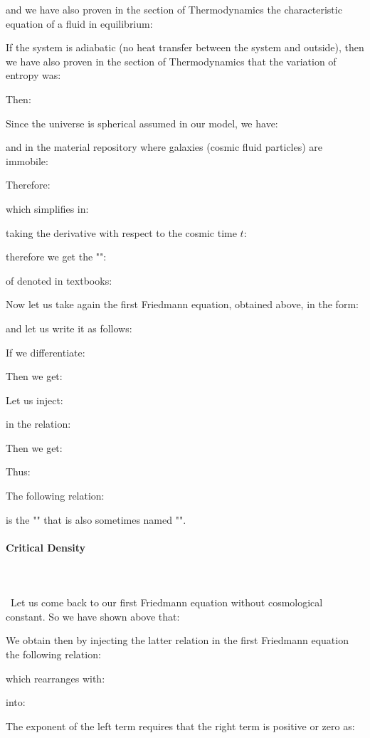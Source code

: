 	and we have also proven in the section of Thermodynamics the characteristic equation of a fluid in equilibrium:
	
	If the system is adiabatic (no heat transfer between the system and outside), then we have also proven in the section of Thermodynamics that the variation of entropy was:
	
	Then:
	
	Since the universe is spherical assumed in our model, we have:
	
	and in the material repository where galaxies (cosmic fluid particles) are immobile:
	
	Therefore:
	
	which simplifies in:
	
	taking the derivative with respect to the cosmic time $t$:
	
	therefore we get the "":
	
	of denoted in textbooks:
	
	Now let us take again the first Friedmann equation, obtained above, in the form:
	
	and let us write it as follows:
	
	If we differentiate:
	
	Then we get:
	
	Let us inject:
	
	in the relation:
	
	Then we get:
	
	Thus:
	
	The following relation:
	
	is the "" that is also sometimes named "".
		
	\paragraph{Critical Density}\mbox{}\\\\\
	Let us come back to our first Friedmann equation without cosmological constant. So we have shown above that:
	
	We obtain then by injecting the latter relation in the first Friedmann equation the following relation:
	
	which rearranges with:
	
	into:
	
	The exponent of the left term requires that the right term is positive or zero as:
	
